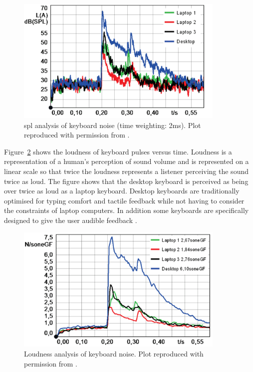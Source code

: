 \begin{figure}[!] %
\centering
\includegraphics[width=100mm]{TypingSPLKeyboards.png}
\caption{\DIFdelbeginFL {}\DIFdelendFL \DIFaddbeginFL \gls{spl} \DIFaddendFL analysis of keyboard noise (time weighting: 2ms). Plot reproduced with permission from \cite{Hauswirth2013}.}\label{fig:TypingSPLKeyboards}
\end{figure}

Figure~\ref{fig:TypingLoudnessKeyboards} shows the loudness of keyboard pulses versus time. Loudness is a representation of a human's perception of sound volume and is represented on a linear scale so that twice the loudness represents a listener perceiving the sound twice as loud. The figure shows that the desktop keyboard is perceived as being over twice as loud as a laptop keyboard. Desktop keyboards are traditionally optimised for typing comfort and tactile feedback while not having to consider the \DIFdelbegin {}\DIFdelend \DIFaddbegin {}\DIFaddend constraints of laptop computers. In addition some keyboards are specifically designed to give the user audible feedback \cite{Hauswirth2013}.

\begin{figure}[!] %
\centering
\includegraphics[width=100mm]{TypingLoudnessKeyboards.png}
\caption{Loudness analysis of keyboard noise. Plot reproduced with permission from \cite{Hauswirth2013}.}\label{fig:TypingLoudnessKeyboards}
\end{figure}

